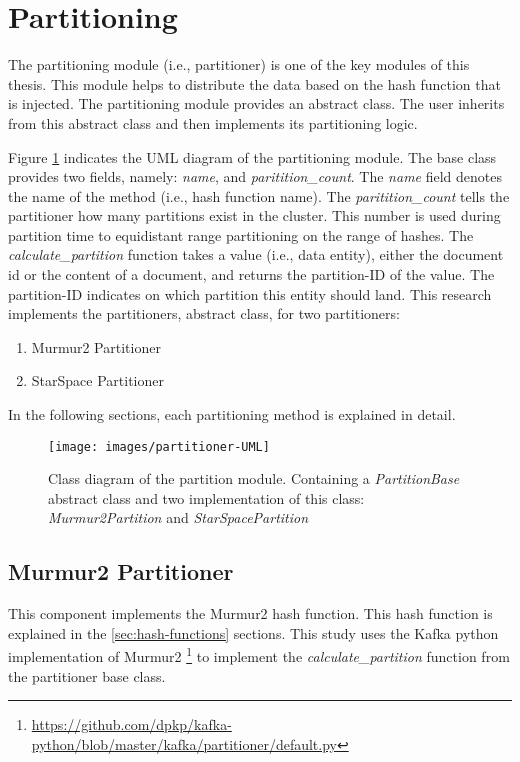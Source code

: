 \section{Partitioning}
\label{sec:partitioning}
The partitioning module (i.e., partitioner) is one of the key modules of this thesis. This module helps to distribute the data based on the hash function that is injected. The partitioning module provides an abstract class. The user inherits from this abstract class and then implements its partitioning logic. 


Figure \ref{fig:partitioner-uml} indicates the UML diagram of the partitioning module. The base class provides two fields, namely: \emph{name}, and \emph{paritition\_count}. The \emph{name} field denotes the name of the method (i.e., hash function name). The \emph{paritition\_count} tells the partitioner how many partitions exist in the cluster. This number is used during partition time to equidistant range partitioning on the range of hashes. The \emph{calculate\_partition} function takes a value (i.e., data entity), either the document id or the content of a document, and returns the partition-ID of the value. The partition-ID indicates on which partition this entity should land. This research implements the partitioners, abstract class, for two partitioners:

\begin{enumerate}
    \item Murmur2 Partitioner
    \item StarSpace Partitioner
\end{enumerate}

In the following sections, each partitioning method is explained in detail.

\begin{figure}[!h]
    \centering
    \texttt{[image: images/partitioner-UML]}
    \caption{Class diagram of the partition module. Containing a \emph{PartitionBase} abstract class and two implementation of this class: \emph{Murmur2Partition} and \emph{StarSpacePartition}}
    \label{fig:partitioner-uml}
\end{figure}


\subsection{Murmur2 Partitioner}
\label{subsec:partitioning-murmur2}
This component implements the Murmur2 hash function. This hash function is explained in the \ref{sec:hash-functions} sections. This study uses the Kafka python implementation of Murmur2 \footnote{\url{https://github.com/dpkp/kafka-python/blob/master/kafka/partitioner/default.py}} to implement the \emph{calculate\_partition} function from the partitioner base class.

